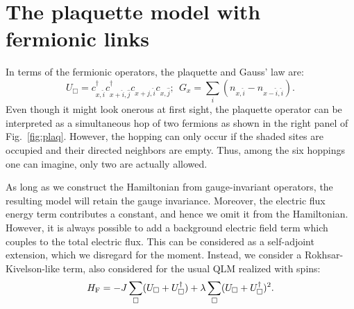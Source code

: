 \documentclass[a4paper,11pt]{article}
\begin{document}
\section{The plaquette model with fermionic links}
  In terms of the fermionic operators, the plaquette and Gauss' law are:
\begin{equation}
 U_{\Box} = c^\dagger_{x,\hat{i}} c^\dagger_{x+\hat{i},\hat{j}} c_{x+\hat{j},\hat{i}} c_{x,\hat{j}};~~
 G_x = \sum_{i} \left( n_{x,\hat{i}} - n_{x-\hat{i},\hat{i}} \right).
 \label{eq:GLfermi}
\end{equation}
  Even though it might look onerous at first sight, the plaquette operator can be interpreted as a 
simultaneous hop of two fermions as shown in the right panel of Fig.~\ref{fig:plaq}. However, the hopping can only occur
if the shaded sites are occupied and their directed neighbors are empty. Thus, among the six hoppings one can
imagine, only two are actually allowed. 

 As long as we construct the Hamiltonian from gauge-invariant operators, the resulting model will retain
the gauge invariance. Moreover, the electric flux energy term contributes a constant,
and hence we omit it from the Hamiltonian. However, it is always possible to add a background electric field 
term which couples to the total electric flux. This can be considered as a self-adjoint extension, which we
disregard for the moment. Instead, we consider a Rokhsar-Kivelson-like term, also considered for the usual
QLM realized with spins:
\begin{equation}
 H_{\rm F} = -J \sum_{\Box} (U_\Box + U^\dagger_\Box) + \lambda \sum_{\Box} (U_\Box + U^\dagger_\Box)^2.
 \label{eq:FHam}
\end{equation}
\end{document}
